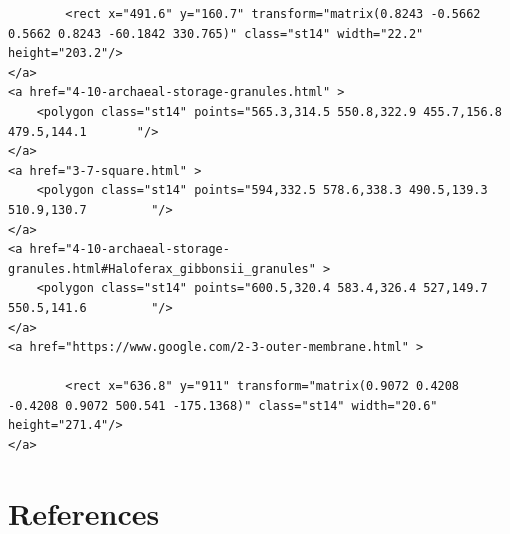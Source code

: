 \documentclass[]{tufte-book}
\begin{document}
\begin{verbatim}
        <rect x="491.6" y="160.7" transform="matrix(0.8243 -0.5662 0.5662 0.8243 -60.1842 330.765)" class="st14" width="22.2" height="203.2"/>
</a>
<a href="4-10-archaeal-storage-granules.html" >
    <polygon class="st14" points="565.3,314.5 550.8,322.9 455.7,156.8 479.5,144.1       "/>
</a>
<a href="3-7-square.html" >
    <polygon class="st14" points="594,332.5 578.6,338.3 490.5,139.3 510.9,130.7         "/>
</a>
<a href="4-10-archaeal-storage-granules.html#Haloferax_gibbonsii_granules" >
    <polygon class="st14" points="600.5,320.4 583.4,326.4 527,149.7 550.5,141.6         "/>
</a>
<a href="https://www.google.com/2-3-outer-membrane.html" >

        <rect x="636.8" y="911" transform="matrix(0.9072 0.4208 -0.4208 0.9072 500.541 -175.1368)" class="st14" width="20.6" height="271.4"/>
</a>
\end{verbatim}

\chapter{References}\label{references}


\end{document}
